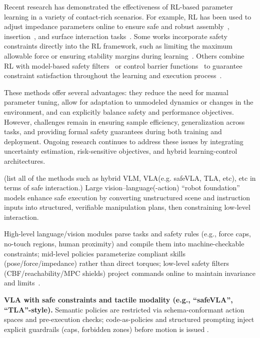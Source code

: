 \documentclass[Afour,sageh,times]{template/sagej}
\newcommand{\suggest}[1]{{\color{olive} (#1)}}
\begin{document}
Recent research has demonstrated the effectiveness of RL-based parameter learning in a variety of contact-rich scenarios. For example, RL has been used to adjust impedance parameters online to ensure safe and robust assembly~\cite{stan2020reinforcement,192,49,174}, insertion~\cite{55,279,344}, and surface interaction tasks~\cite{61}. Some works incorporate safety constraints directly into the RL framework, such as limiting the maximum allowable force or ensuring stability margins during learning~\cite{287,66, zhang2024srl}. Others combine RL with model-based safety filters~\cite{tang2024learning} or control barrier functions~\cite{zhang_enhancing_nodate} to guarantee constraint satisfaction throughout the learning and execution process~\cite{zhang2024srl}.

These methods offer several advantages: they reduce the need for manual parameter tuning, allow for adaptation to unmodeled dynamics or changes in the environment, and can explicitly balance safety and performance objectives. However, challenges remain in ensuring sample efficiency, generalization across tasks, and providing formal safety guarantees during both training and deployment. Ongoing research continues to address these issues by integrating uncertainty estimation, risk-sensitive objectives, and hybrid learning-control architectures.

\suggest{list all of the methods such as hybrid VLM, VLA(e.g. safeVLA, TLA, etc), etc in terms of safe interaction.}
Large vision–language(-action) “robot foundation” models enhance safe execution by converting unstructured scene and instruction inputs into structured, verifiable manipulation plans, then constraining low‑level interaction.

High-level language/vision modules parse tasks and safety rules (e.g., force caps, no-touch regions, human proximity) and compile them into machine-checkable constraints; mid-level policies parameterize compliant skills (pose/force/impedance) rather than direct torques; low-level safety filters (CBF/reachability/MPC shields) project commands online to maintain invariance and limits~\citep{330}.

\textbf{ VLA with safe constraints and tactile modality (e.g., “safeVLA”, “TLA”-style).}
Semantic policies are restricted via schema-conformant action spaces and pre-execution checks; code-as-policies and structured prompting inject explicit guardrails (caps, forbidden zones) before motion is issued \citep{33,330,10705419, zhang2025vtla, huang2025tactile, yang2025bitla, cheng2025omnivtla}.
\end{document}
